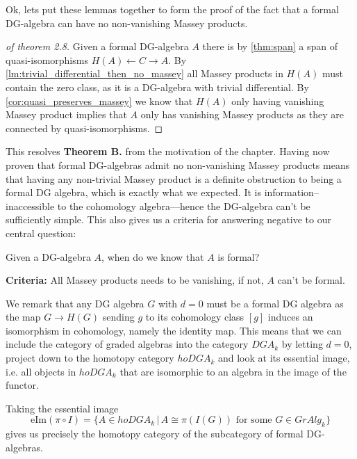 Ok, lets put these lemmas together to form the proof of the fact that a formal DG-algebra can have no non-vanishing Massey products. 

\begin{proof}[of theorem 2.8]
Given a formal DG-algebra $A$ there is by \ref{thm:span} a span of quasi-isomorphisms $H(A)\longleftarrow C\longrightarrow A$. By \cref{lm:trivial_differential_then_no_massey} all Massey products in $H(A)$ must contain the zero class, as it is a DG-algebra with trivial differential. By \cref{cor:quasi_preserves_massey} we know that $H(A)$ only having vanishing Massey product implies that $A$ only has vanishing Massey products as they are connected by quasi-isomorphisms. 
\end{proof}

This resolves \textbf{Theorem B.} from the motivation of the chapter. Having now proven that formal DG-algebras admit no non-vanishing Massey products means that having any non-trivial Massey product is a definite obstruction to being a formal DG algebra, which is exactly what we expected. It is information--inaccessible to the cohomology algebra---hence the DG-algebra can't be sufficiently simple. This also 	gives us a criteria for answering negative to our central question: 

\begin{central}
Given a DG-algebra $A$, when do we know that $A$ is formal?
\end{central}
\textbf{Criteria:} All Massey products needs to be vanishing, if not, $A$ can't be formal. 

We remark that any DG algebra $G$ with $d=0$ must be a formal DG algebra as the map $G\longrightarrow H(G)$ sending $g$ to its cohomology class $[g]$ induces an isomorphism in cohomology, namely the identity map. This means that we can include the category of graded algebras into the category $DGA_k$ by letting $d=0$, project down to the homotopy category $hoDGA_k$ and look at its essential image, i.e. all objects in $hoDGA_k$ that are isomorphic to an algebra in the image of the functor. 
\begin{center}
\end{center}
Taking the essential image
\begin{equation*}
    \text{eIm}(\pi\circ I) = \{A\in hoDGA_k \,\vert\, A\cong \pi( I(G)) \text{ for some } G\in GrAlg_k\}
\end{equation*}
gives us precisely the homotopy category of the subcategory of formal DG-algebras. 

